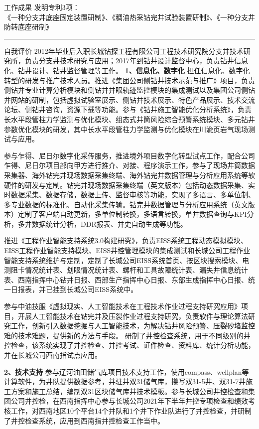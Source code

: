\documentclass[10pt]{ctexart}
\begin{document}
\begin{mybox}[colbacktitle=MidnightBlue]{工作成果}
发明专利3项：\\
《一种分支井底座固定装置研制》、《稠油热采钻完井试验装置研制》、《一种分支井防转底座研制》
\end{mybox}
\newpage
{\noindent\color{MidnightBlue}\rule{\textwidth}{4pt}}
\begin{mybox}[colbacktitle=MidnightBlue]{自我评价}
\qquad 2012年毕业后入职长城钻探工程有限公司工程技术研究院分支井技术研究所，负责分支井技术研究与应用；2017年到钻井设计监督中心，负责钻井信息化、钻井设计、钻井监督管理等工作。
\indexspace
\textbf{1、信息化、数字化}
\indexspace 
\qquad 担任信息化、数字化转型的研发与推广技术人员。推进《集团公司侧钻井技术示范与推广》项目，负责侧钻井专业计算分析模块和侧钻井井眼轨迹监控模块的集成测试以及集团公司侧钻井网站的研制，包括虚拟试验室展示、侧钻井技术展示、特色产品展示、技术交流论坛、侧钻井咨询，资源下载等功能。参与《钻井施工智能优化分析系统》，负责长水平段管柱力学监测与优化模块、组态式井筒风险综合预警系统模块、多元钻井参数优化模块的研发，其中长水平段管柱力学监测与优化模块在川渝页岩气现场测试与应用。

\qquad 参与乍得、尼日尔数字化采传服务，推进境外项目数字化转型试点工作，配合公司乍得、尼日尔项目部向甲方进行推介、对接、程序演示工作，参与了现场井筒数据采集器、海外钻完井现场数据采集终端、海外钻完井数据管理与分析应用系统等软硬件的研发与定制。钻完井现场数据采集终端（英文版本）包括动态数据采集、实时数据采集、数据存储，数据上传、监督审核等功能，实现了多语言、多单位制、多专业数据的标准化、自动化采集传输。钻完井数据管理与分析应用系统（英文版本）定制了客户端自动更新，多单位制转换，多语言转换，单井数据查询与KPI分析，多井数据统计分析，DDR报表、井史自动生成等功能。

\qquad 推进《工程作业智能支持系统3.0构建研究》，负责EISS系统工程动态模拟模块、EISS工程作业智能支持模块、EISS井控管理模块的集成测试和长城公司工程作业智能支持系统维护与定制，定制了长城公司EISS系统首页、按区块搜索模块、电测阻卡情况统计表、划眼情况统计表、螺杆和工具故障统计表、漏失井信息统计表、西南指挥中心钻井日报、西部生产指挥中心日报、东部生成指挥中心日报、统一日报表，并已挂到长城公司EISS系统中。

\qquad 参与中油技服《虚拟现实、人工智能技术在工程技术作业过程支持研究应用》项目，开展人工智能技术在钻完井及压裂作业过程支持研究，负责软件与理论算法研究工作，创新引入数据挖掘与人工智能技术，为解决钻井风险预警、压裂砂堵监控难的技术难题，提供新的方法与手段。
研制了井控检查系统，用于不同级别的井控检查，该系统实现了井控检查、井控考试、证件检查、资料库、统计分析功能，并在长城公司西南指试点应用。

\indexspace 
\textbf{2、技术支持}
\indexspace 
 \qquad 参与辽河油田储气库项目技术支持工作，使用compass、wellplan等计算软件，为井队提供数据参考，并驻井双31储气库，攥写双31-5井、双31-7井施工方案和施工总结，编制双31区块储气库井技术模板。参与长城公司井控检查和集团公司井控检，在西南指挥中心参与长城公司2021年下半年井控专项检查和绩效考核工作，对西南地区10个平台14个井队和1个井下作业队进行了井控检查，并研制了井控检查系统，应用到西南指井控检查工作当中。
\end{mybox}
\end{document}
